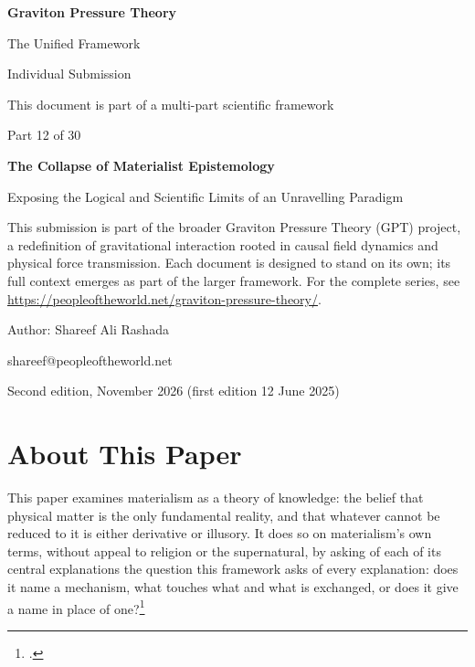 \documentclass[11pt,a4paper]{article}
\newcommand{\fn}[1]{\footnote{\citealp{#1}.}}
\begin{document}
\renewcommand{\thetable}{12.\arabic{table}}
\begin{titlepage}
\centering
\vspace*{1.5cm}
{\Huge\bfseries Graviton Pressure Theory\par}
\vspace{0.4cm}
{\Large The Unified Framework\par}
{\large Individual Submission\par}
\vspace{0.3cm}
{\normalsize This document is part of a multi-part scientific framework\par}
\vspace{1.6cm}
{\large Part 12 of 30\par}
\vspace{0.6cm}
{\huge\bfseries The Collapse of Materialist Epistemology\par}
\vspace{0.5cm}
{\Large Exposing the Logical and Scientific Limits of an Unravelling Paradigm\par}
\vspace{1.4cm}
\begin{minipage}{0.82\textwidth}\centering\small
This submission is part of the broader Graviton Pressure Theory (GPT) project, a redefinition of gravitational interaction rooted in causal field dynamics and physical force transmission. Each document is designed to stand on its own; its full context emerges as part of the larger framework. For the complete series, see \url{https://peopleoftheworld.net/graviton-pressure-theory/}.
\end{minipage}
\vfill
{\large Author: Shareef Ali Rashada\par}
{\normalsize shareef@peopleoftheworld.net\par}
\vspace{0.3cm}
{\normalsize Second edition, November 2026 \quad (first edition 12 June 2025)\par}
\end{titlepage}

\tableofcontents
\newpage

\section*{About This Paper}

This paper examines materialism as a theory of knowledge: the belief that physical matter is the only fundamental reality, and that whatever cannot be reduced to it is either derivative or illusory. It does so on materialism's own terms, without appeal to religion or the supernatural, by asking of each of its central explanations the question this framework asks of every explanation: does it name a mechanism, what touches what and what is exchanged, or does it give a name in place of one?\fn{rashadaPart1}
\end{document}
